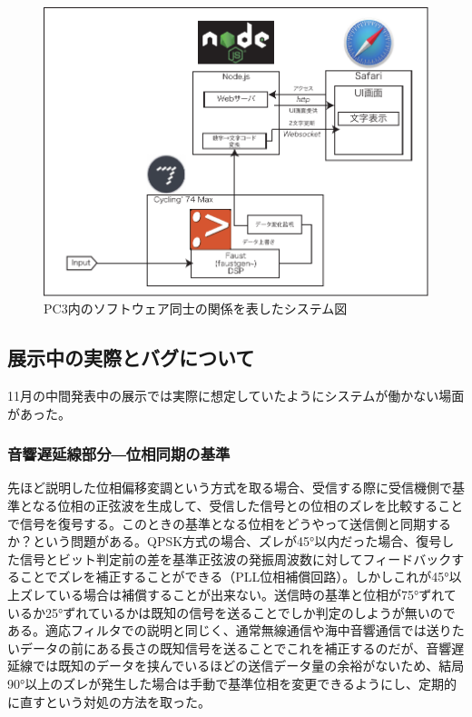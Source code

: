 \documentclass[a4paper,report]{jsbook}
\begin{document}
\begin{no-prefix-figure-caption}

\begin{figure}[htbp]
\centering
\includegraphics[width=1.00000\textwidth]{./img/qam2speech_diagram.pdf}
\caption{PC3内のソフトウェア同士の関係を表したシステム図}
\end{figure}

\end{no-prefix-figure-caption}

\subsection{展示中の実際とバグについて}\label{ux5c55ux793aux4e2dux306eux5b9fux969bux3068ux30d0ux30b0ux306bux3064ux3044ux3066}

11月の中間発表中の展示では実際に想定していたようにシステムが働かない場面があった。

\subsubsection{音響遅延線部分―位相同期の基準}\label{ux97f3ux97ffux9045ux5ef6ux7ddaux90e8ux5206ux4f4dux76f8ux540cux671fux306eux57faux6e96}

先ほど説明した位相偏移変調という方式を取る場合、受信する際に受信機側で基準となる位相の正弦波を生成して、受信した信号との位相のズレを比較することで信号を復号する。このときの基準となる位相をどうやって送信側と同期するか？という問題がある。QPSK方式の場合、ズレが45°以内だった場合、復号した信号とビット判定前の差を基準正弦波の発振周波数に対してフィードバックすることでズレを補正することができる（PLL位相補償回路）。しかしこれが45°以上ズレている場合は補償することが出来ない。送信時の基準と位相が75°ずれているか25°ずれているかは既知の信号を送ることでしか判定のしようが無いのである。適応フィルタでの説明と同じく、通常無線通信や海中音響通信では送りたいデータの前にある長さの既知信号を送ることでこれを補正するのだが、音響遅延線では既知のデータを挟んでいるほどの送信データ量の余裕がないため、結局90°以上のズレが発生した場合は手動で基準位相を変更できるようにし、定期的に直すという対処の方法を取った。
\end{document}
